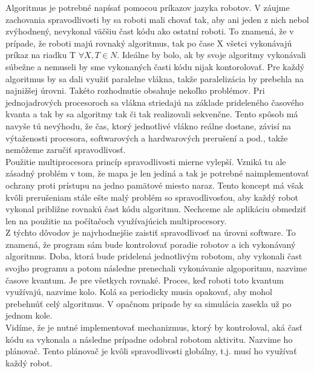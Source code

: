 Algoritmus je potrebné napísať pomocou príkazov jazyka robotov. V záujme zachovania spravodlivosti by sa roboti mali chovať tak, aby ani jeden z nich nebol zvýhodnený, nevykonal väčšiu čast kódu ako ostatní roboti. To znamená, že v prípade, že roboti majú rovnaký algoritmus, tak po čase X všetci vykonávajú príkaz na riadku T $ \forall X,T \in N $.  Ideálne by bolo, ak by svoje algoritmy vykonávali súbežne a nemuseli by sme vykonaných časti kódu nijak kontorolovať. Pre každý algoritmus by sa dali využiť paralelne vlákna, takže paralelizácia by prebehla na najnižšej úrovni. Takéto rozhodnutie obsahuje nekoľko problémov. Pri jednojadrových procesoroch sa vlákna striedajú na základe prideleného časového kvanta a tak by sa algoritmy tak či tak realizovali sekvenčne. Tento spôsob má navyše tú nevýhodu, že čas, ktorý jednotlivé vlákno reálne dostane, závisí na výtaženosti procesora, softwarových a hardwarových prerušení a pod., takže nemôžeme zaručiť spravodlivosť. \\
Použitie multiprocesora princíp spravodlivosti mierne vylepší. Vzniká tu ale zásadný problém v tom, že mapa je len jediná a tak je potrebné naimplementovať ochrany proti prístupu na jedno pamätové miesto naraz. Tento koncept má však kvôli prerušeniam stále ešte malý problém so spravodlivosťou, aby každý robot vykonal približne rovnakú čast kódu algoritmu. Nechceme ale aplikáciu obmedziť len na použitie na počítačoch využívajúcich multiprocesory. \\ %
Z týchto dôvodov je najvhodnejšie zaistiť spravodlivosť na úrovni software. To znamená, že program sám bude kontrolovať poradie robotov a ich vykonávaný algoritmus.
Doba, ktorá bude pridelená jednotlivým robotom, aby vykonali čast svojho programu a potom následne prenechali vykonávanie algoporitmu, nazvime časove kvantum. Je pre všetkych rovnaké. Proces, keď roboti toto kvantum využívajú, nazvime kolo. %
Kolá sa periodicky musia opakovať, aby mohol prebehnúť celý algoritmus. V opačnom pripade by sa simulácia zasekla už po jednom kole. \\ %
Vidíme,  že je nutné implementovať mechanizmus, ktorý by kontroloval, aká časť kódu sa vykonala a následne prípadne odobral robotom aktivitu. Nazvime ho plánovač. Tento plánovač je kvôli spravodlivosti globálny,  t.j. musí ho využívať každý robot.%
